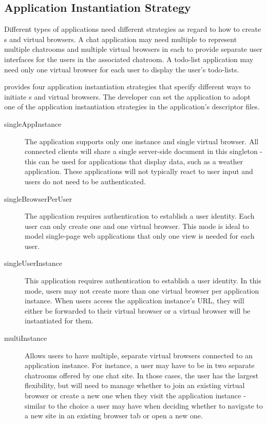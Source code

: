 \subsection{Application Instantiation Strategy}
\label{sec:appinstantiation}

Different types of applications need different strategies as regard to how to 
create \appins{}s and virtual browsers.
A chat application may need multiple \appins{} to represent multiple chatrooms
and multiple virtual browsers in each \appins{} to provide separate user
interfaces for the users in the associated chatroom.
A todo-list application may need only one virtual browser for each user to 
display the user's todo-lists.

\cb{} provides four application instantiation strategies that
specify different ways to initiate \appins{}s and virtual browsers.
The developer can set the application to adopt one of the application instantiation strategies
in the application's descriptor files.

\begin{description}

\item[singleAppInstance] The application supports only one instance and single virtual browser.
    All connected clients will share a single server-side document in this singleton - this can be
    used for applications that display data, such as a weather application. These applications will not
    typically react to user input and users do not need to be authenticated.

\item[singleBrowserPerUser] The application requires authentication to establish a
    user identity. Each user can only create one \appins and one virtual browser.
    This mode is ideal to model single-page web applications that only one view is needed
    for each user.

\item[singleUserInstance]  This application requires authentication to establish a
    user identity. In this mode, users may not create more than one virtual browser per
    application instance.  When users access the application instance's URL, they will either
    be forwarded to their virtual browser or a virtual browser will be instantiated for them.

\item[multiInstance]
    Allows users to have multiple, separate virtual browsers connected to an application
    instance. For instance, a user may have to be in two separate chatrooms offered by one chat site.
    In those cases, the user has the largest flexibility, but will need to manage whether
    to join an existing virtual browser or create a new one when they visit the application instance
    - similar to the choice a user may have when deciding whether to navigate to a new site in
    an existing browser tab or open a new one.

\end{description}

